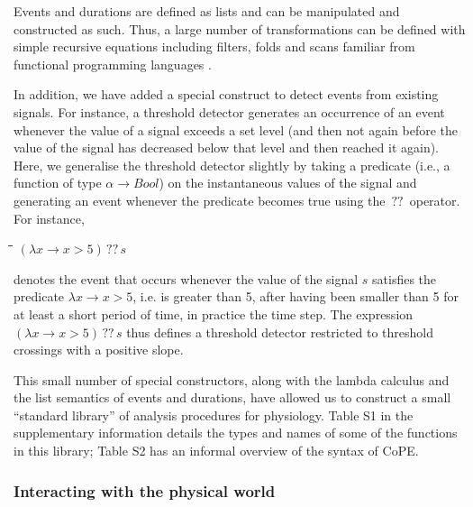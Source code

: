 \documentclass[11pt]{article}
\newlength{\lwidth}\setlength{\lwidth}{4.5cm}
\newlength{\cwidth}\setlength{\cwidth}{8mm} %
\newcommand{\Conid}[1]{\mathit{#1}}
\newcommand{\Varid}[1]{\mathit{#1}}
\begin{document}
Events and durations are defined as lists and can be manipulated and
constructed as such. Thus, a large number of transformations can be
defined with simple recursive equations including filters, folds and
scans familiar from functional programming languages
\cite{Hughes1989}.

In addition, we have added a special construct to detect events from
existing signals. For instance, a threshold detector generates an
occurrence of an event whenever the value of a signal exceeds a set
level (and then not again before the value of the signal has decreased
below that level and then reached it again).  Here, we generalise the
threshold detector slightly by taking a predicate (i.e., a function of
type \ensuremath{\alpha\to \Conid{Bool}}) on the instantaneous values of the signal and
generating an event whenever the predicate becomes true using the \ensuremath{\,??\,}
operator. For instance,
\begin{tabbing}
\qquad\=\hspace{\lwidth}\=\hspace{\cwidth}\=\+\kill
${(\lambda \Varid{x}\to \Varid{x}\mathbin{>}\mathrm{5})\,??\,\Varid{s}}$
\end{tabbing}denotes the event that occurs whenever the value of the signal \ensuremath{\Varid{s}}
satisfies the predicate \ensuremath{\lambda \Varid{x}\to \Varid{x}\mathbin{>}\mathrm{5}}, i.e. is greater than 5, after having been
smaller than 5 for at least a short period of time, in practice the
time step. The expression \ensuremath{(\lambda \Varid{x}\to \Varid{x}\mathbin{>}\mathrm{5})\,??\,\Varid{s}} thus defines a threshold
detector restricted to threshold crossings with a positive slope.

This small number of special constructors, along with the lambda
calculus and the list semantics of events and durations, have allowed
us to construct a small ``standard library'' of analysis procedures
for physiology. Table S1 in the supplementary information details the
types and names of some of the functions in this library; Table S2 has
an informal overview of the syntax of CoPE.

\subsubsection*{Interacting with the physical world}
\end{document}
